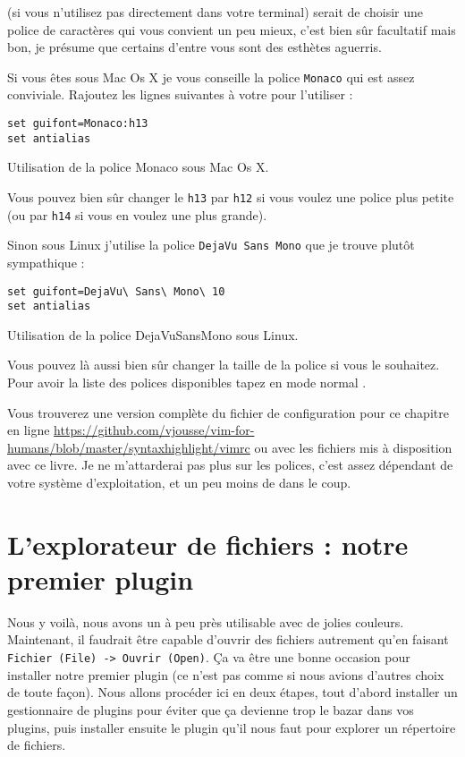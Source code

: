  (si vous n'utilisez pas \vim directement dans votre terminal) serait de choisir une police de caractères qui vous convient un peu mieux, c'est bien sûr facultatif mais bon, je présume que certains d'entre vous sont des esthètes aguerris.

Si vous êtes sous Mac Os X je vous conseille la police \Verb|Monaco| qui est assez conviviale. Rajoutez les lignes suivantes à votre \vimrc pour l'utiliser :

\begin{listing}[H]
\begin{verbatim}
set guifont=Monaco:h13
set antialias
\end{verbatim}
  \caption{Utilisation de la police Monaco sous Mac Os X.}
  \label{lst:monaco}
\end{listing}

Vous pouvez bien sûr changer le \Verb|h13| par \Verb|h12| si vous voulez une police plus petite (ou par \Verb|h14| si vous en voulez une plus grande).

Sinon sous Linux j'utilise la police \Verb|DejaVu Sans Mono| que je trouve plutôt sympathique :

\begin{listing}[H]
\begin{verbatim}
set guifont=DejaVu\ Sans\ Mono\ 10
set antialias
\end{verbatim}
  \caption{Utilisation de la police DejaVuSansMono sous Linux.}
  \label{lst:dejavusansmono}
\end{listing}

Vous pouvez là aussi bien sûr changer la taille de la police si vous le souhaitez. Pour avoir la liste des polices disponibles tapez en mode normal .

Vous trouverez une version complète du fichier de configuration pour ce chapitre en ligne \url{https://github.com/vjousse/vim-for-humans/blob/master/syntaxhighlight/vimrc} ou avec les fichiers mis à disposition avec ce livre. Je ne m'attarderai pas plus sur les polices, c'est assez dépendant de votre système d'exploitation, et un peu moins de \vim dans le coup.


\section{L'explorateur de fichiers : notre premier plugin}

Nous y voilà, nous avons un \vim à peu près utilisable avec de jolies couleurs. Maintenant, il faudrait être capable d'ouvrir des fichiers autrement qu'en faisant \Verb|Fichier (File) -> Ouvrir (Open)|. Ça va être une bonne occasion pour installer notre premier plugin (ce n'est pas comme si nous avions d'autres choix de toute façon). Nous allons procéder ici en deux étapes, tout d'abord installer un gestionnaire de plugins pour éviter que ça devienne trop le bazar dans vos plugins, puis installer ensuite le plugin qu'il nous faut pour explorer un répertoire de fichiers.

